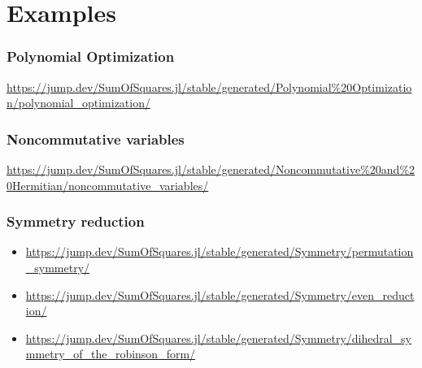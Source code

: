 \documentclass{beamer}
\begin{document}
  \section{Examples}
  \begin{frame}
    \frametitle{Polynomial Optimization}
    \url{https://jump.dev/SumOfSquares.jl/stable/generated/Polynomial\%20Optimization/polynomial_optimization/}
  \end{frame}
  \begin{frame}
    \frametitle{Noncommutative variables}
    \url{https://jump.dev/SumOfSquares.jl/stable/generated/Noncommutative\%20and\%20Hermitian/noncommutative_variables/}
  \end{frame}
  \begin{frame}
    \frametitle{Symmetry reduction}
    \begin{itemize}
      \item \url{https://jump.dev/SumOfSquares.jl/stable/generated/Symmetry/permutation_symmetry/}
      \item \url{https://jump.dev/SumOfSquares.jl/stable/generated/Symmetry/even_reduction/}
      \item \url{https://jump.dev/SumOfSquares.jl/stable/generated/Symmetry/dihedral_symmetry_of_the_robinson_form/}
    \end{itemize}
  \end{frame}
\end{document}
